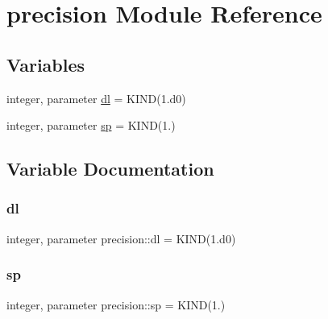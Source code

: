 \hypertarget{namespaceprecision}{}\section{precision Module Reference}
\label{namespaceprecision}
\subsection*{Variables}
\begin{DoxyCompactItemize}
\item 
integer, parameter \mbox{\hyperlink{namespaceprecision_a34a15691a6734158d4c6252803a41375}{dl}} = K\+I\+ND(1.d0)
\item 
integer, parameter \mbox{\hyperlink{namespaceprecision_a77972bedd8bb4ade1aeb2401fdfcda3f}{sp}} = K\+I\+ND(1.)
\end{DoxyCompactItemize}


\subsection{Variable Documentation}
\mbox{\label{namespaceprecision_a34a15691a6734158d4c6252803a41375}} 
\subsubsection{\texorpdfstring{dl}{dl}}
{\footnotesize\ttfamily integer, parameter precision\+::dl = K\+I\+ND(1.d0)}

\mbox{\label{namespaceprecision_a77972bedd8bb4ade1aeb2401fdfcda3f}} 
\subsubsection{\texorpdfstring{sp}{sp}}
{\footnotesize\ttfamily integer, parameter precision\+::sp = K\+I\+ND(1.)}

